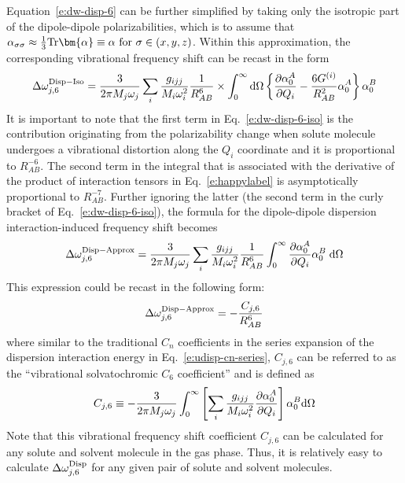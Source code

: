 \documentclass[a4paper,titlepage,twoside,fleqn,12pt]{book}
\newcommand{\BM}[1]{\bm{#1}}
\newcommand{\fderiv}[2]{\ensuremath{
    \frac{\partial #1}{\partial #2}}}
\begin{document}
\begin{refsection}
Equation~\eqref{e:dw-disp-6} can be further simplified by taking only the isotropic 
part of the dipole\hyp{}dipole polarizabilities, which is to assume that 
$\alpha_{\sigma\sigma} \approx \frac{1}{3}{\rm Tr}{\BM\alpha} \equiv \alpha \text{ for } \sigma \in (x, y, z)$. 
Within this approximation, the corresponding vibrational frequency shift 
can be recast in the form
%
\begin{equation} \label{e:dw-disp-6-iso}
\Delta \omega_{j,6}^{\rm Disp-Iso} = \frac{3}{2\pi M_j\omega_j}
\sum_i \frac{g_{ijj}}{M_i\omega_i^2} 
\frac{1}{R^6_{AB}} \times
\int_{0}^{\infty} {\rm d}\Omega \left\{ 
\frac{\partial \alpha_0^{A}}{\partial Q_i}- 
\frac{6G^{(i)}}{R^2_{AB}} 
\alpha_0^{A}
\right\}
\alpha_0^{B} 
\end{equation}
%
It is important to note that the first term in Eq.~\eqref{e:dw-disp-6-iso} 
is the contribution originating from the polarizability change 
when solute molecule undergoes a vibrational distortion 
along the $Q_i$ coordinate and it is proportional to $R^{-6}_{AB}$. 
The second term in the integral that is associated with the derivative 
of the product of interaction tensors in Eq.~\eqref{e:happylabel}
is asymptotically proportional to $R^{-7}_{AB}$. Further ignoring the latter 
(the second term in the curly bracket of Eq.~\eqref{e:dw-disp-6-iso}), 
the formula for the dipole\hyp{}dipole dispersion interaction\hyp{}induced 
frequency shift becomes
%
\begin{equation} \label{e:dw-disp-6-iso-approx}
\Delta \omega_{j,6}^{\rm Disp-Approx} = \frac{3}{2\pi M_j\omega_j}
\sum_i \frac{g_{ijj}}{M_i\omega_i^2} 
\frac{1}{R^6_{AB}} 
\int_{0}^{\infty} 
\frac{\partial \alpha_0^{A}}{\partial Q_i}
\alpha_0^{B}  \;{\rm d}\Omega  
\end{equation}
%
This expression could be recast in the following form: 
%
\begin{equation} \label{e:dw-disp-6-iso-approx-cj6}
\Delta \omega_{j,6}^{\rm Disp-Approx} = 
 - \frac{C_{j,6}}{R_{AB}^6}
\end{equation}
%
where similar to the traditional $C_n$ coefficients 
in the series expansion of the dispersion interaction 
energy in Eq.~\eqref{e:udisp-cn-series}, $C_{j,6}$ 
can be referred to as 
the ``vibrational solvatochromic $C_6$ coefficient''
and is defined as
%
\begin{equation} \label{e:cj6}
C_{j,6} \equiv
-\frac{3}{2\pi M_j\omega_j} 
\int_{0}^{\infty} 
\left[
\sum_i \frac{g_{ijj}}{M_i\omega_i^2} 
\fderiv{\alpha_0^{A}}{Q_i}
\right]
\alpha_0^{B} 
{\rm d}\Omega  
\end{equation}
%
Note that this vibrational frequency shift coefficient 
$C_{j,6}$ can be calculated for any solute and solvent 
molecule in the gas phase. Thus, it is relatively easy 
to calculate $\Delta \omega_{j,6}^{\rm Disp}$ for any 
given pair of solute and solvent molecules.


\end{refsection}
\end{document}
